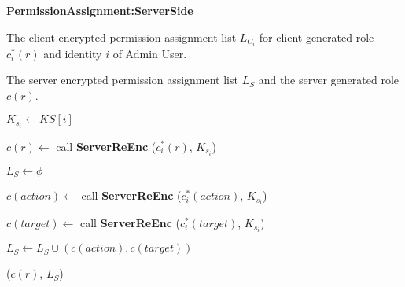 \documentclass[final,5p,times,twocolumn]{elsarticle}
\newcommand{\algofontsize}{\fontsize{7}{8}\selectfont}
\begin{document}
\begin{algorithm}[htp]
{\algofontsize
\caption{\textbf{PermissionAssignment:ServerSide}}

\label{algo:deploy-permission-assignment-server-side}

\begin{algorithmic}[1]

\REQUIRE The client encrypted permission assignment list $L_{C_i}$ for client generated role $c^*_i (r)$ and identity $i$ of Admin User.

\ENSURE The server encrypted permission assignment list $L_{S}$ and the server generated role $c(r)$.

\medskip

\STATE $K_{s_i} \leftarrow KS[i]$ {\algofontsize {}} \label{line:deploy-pa-ss-ks}

\STATE $c(r) \leftarrow$ call \textbf{ServerReEnc} ($c^*_i (r)$, $K_{s_i}$) \label{line:deploy-pa-ss-role}

\STATE $L_{S} \leftarrow \phi$ \label{line:deploy-pa-ss-init}

 \label{line:deploy-pa-ss-loop}

	\STATE $c(action) \leftarrow$ call \textbf{ServerReEnc} ($c^*_i (action)$, $K_{s_i}$) \label{line:deploy-pa-ss-action}
	
	\STATE $c(target) \leftarrow$ call \textbf{ServerReEnc} ($c^*_i (target)$, $K_{s_i}$) \label{line:deploy-pa-ss-target}
	
	\STATE $L_{S} \leftarrow L_{S} \cup (c(action), c(target))$ \label{line:deploy-pa-ss-update}

\ENDFOR

\RETURN ($c(r)$, $L_{S}$)

\end{algorithmic}
}
\end{algorithm}
\end{document}
